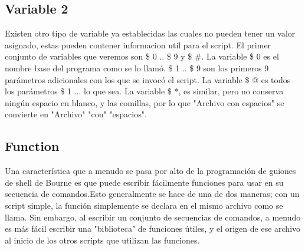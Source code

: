 \documentclass{article}
\begin{document}
\subsection{Variable 2}
Existen otro tipo de variable ya establecidas las cuales no pueden tener un valor asignado, estas pueden contener informacion util para el script.
\newline
El primer conjunto de variables que veremos son \$ 0 .. \$ 9 y \$ #.
La variable \$ 0 es el nombre base del programa como se lo llamó.
\$ 1 .. \$ 9 son los primeros 9 parámetros adicionales con los que se invocó el script.
La variable \$ @ es todos los parámetros \$ 1 ... lo que sea. La variable \$ *, es similar, pero no conserva ningún espacio en blanco, y las comillas, por lo que "Archivo con espacios" se convierte en "Archivo" "con" "espacios". 




\subsection{Function}
Una característica que a menudo se pasa por alto de la programación de guiones de shell de Bourne es que puede escribir fácilmente funciones para usar en su secuencia de comandos.Esto generalmente se hace de una de dos maneras; con un script simple, la función simplemente se declara en el mismo archivo como se llama.
Sin embargo, al escribir un conjunto de secuencias de comandos, a menudo es más fácil escribir una "biblioteca" de funciones útiles, y el origen de ese archivo al inicio de los otros scripts que utilizan las funciones.
\end{document}

